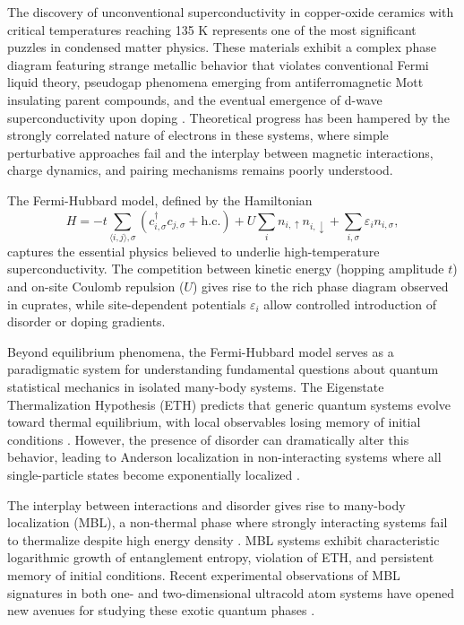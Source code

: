 
The discovery of unconventional superconductivity in copper-oxide ceramics with critical temperatures reaching 135 K represents one of the most significant puzzles in condensed matter physics. These materials exhibit a complex phase diagram featuring strange metallic behavior that violates conventional Fermi liquid theory, pseudogap phenomena emerging from antiferromagnetic Mott insulating parent compounds, and the eventual emergence of d-wave superconductivity upon doping \cite{koepsell_quantum_2021}. Theoretical progress has been hampered by the strongly correlated nature of electrons in these systems, where simple perturbative approaches fail and the interplay between magnetic interactions, charge dynamics, and pairing mechanisms remains poorly understood.

The Fermi-Hubbard model, defined by the Hamiltonian
\begin{equation}
H = -t \sum_{\langle i,j \rangle, \sigma} \left( c_{i,\sigma}^\dagger c_{j,\sigma} + \text{h.c.} \right) + U \sum_i n_{i,\uparrow} n_{i,\downarrow} + \sum_{i,\sigma} \varepsilon_i n_{i,\sigma},
\end{equation}
captures the essential physics believed to underlie high-temperature superconductivity. The competition between kinetic energy (hopping amplitude $t$) and on-site Coulomb repulsion ($U$) gives rise to the rich phase diagram observed in cuprates, while site-dependent potentials $\varepsilon_i$ allow controlled introduction of disorder or doping gradients.

Beyond equilibrium phenomena, the Fermi-Hubbard model serves as a paradigmatic system for understanding fundamental questions about quantum statistical mechanics in isolated many-body systems. The Eigenstate Thermalization Hypothesis (ETH) predicts that generic quantum systems evolve toward thermal equilibrium, with local observables losing memory of initial conditions \cite{deutsch_quantum_1991,srednicki_chaos_1994}. However, the presence of disorder can dramatically alter this behavior, leading to Anderson localization in non-interacting systems where all single-particle states become exponentially localized \cite{anderson_absence_1958,billy_direct_2008,roati_anderson_2008}.

The interplay between interactions and disorder gives rise to many-body localization (MBL), a non-thermal phase where strongly interacting systems fail to thermalize despite high energy density \cite{basko_metalinsulator_2006,nandkishore_many-body_2015,abanin_colloquium_2019}. MBL systems exhibit characteristic logarithmic growth of entanglement entropy, violation of ETH, and persistent memory of initial conditions. Recent experimental observations of MBL signatures in both one- and two-dimensional ultracold atom systems have opened new avenues for studying these exotic quantum phases \cite{schreiber_observation_2015,choi_exploring_2016,bordia_probing_2017}.

